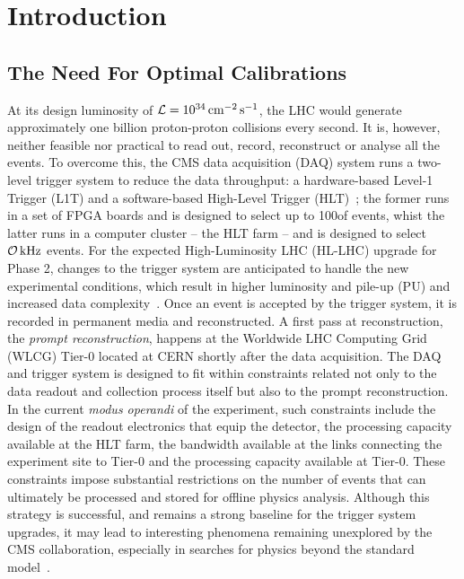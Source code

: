 \chapter{Introduction}

\section{The Need For Optimal Calibrations}
At its design luminosity of $\mathcal{L} = 10^{34}\,\text{cm}^{-2}\,\text{s}^{-1}$, the LHC would generate approximately one billion proton-proton collisions every second. It is, however, neither feasible nor practical to read out, record, reconstruct or analyse all the events. To overcome this, the CMS data acquisition (DAQ) system \cite{CMScollab} runs a two-level trigger system to reduce the data throughput: a hardware-based Level-1 Trigger (L1T) and a software-based High-Level Trigger (HLT)~\cite{CMS:2016ngn}; the former runs in a set of FPGA boards and is designed to select up to 100\kHz of events, whist the latter runs in a computer cluster -- the HLT farm -- and is designed to select $\mathcal{O}\,\text{kHz}$ events. For the expected High-Luminosity LHC (HL-LHC) upgrade for Phase 2, changes to the trigger system are anticipated to handle the new experimental conditions, which result in higher luminosity and pile-up (PU) and increased data complexity~\cite{Collaboration:2759072, CERN-LHCC-2020-004}. 
\newline \newline
Once an event is accepted by the trigger system, it is recorded in permanent media and reconstructed. A first pass at reconstruction, the \emph{prompt reconstruction}, happens at the Worldwide LHC Computing Grid (WLCG) Tier-0 located at CERN shortly after the data acquisition. The DAQ and trigger system is designed to fit within constraints related not only to the data readout and collection process itself but also to the prompt reconstruction.
\newline \newline
In the current \textit{modus operandi} of the experiment, such constraints include the design of the readout electronics that equip the detector, the processing capacity available at the HLT farm, the bandwidth available at the links connecting the experiment site to Tier-0 and the processing capacity available at Tier-0. These constraints impose substantial restrictions on the number of events that can ultimately be processed and stored for offline physics analysis. Although this strategy is successful, and remains a strong baseline for the trigger system upgrades, it may lead to interesting phenomena remaining unexplored by the CMS collaboration, especially in searches for physics beyond the standard model~\cite{cms_exotica_summary_plots}.
